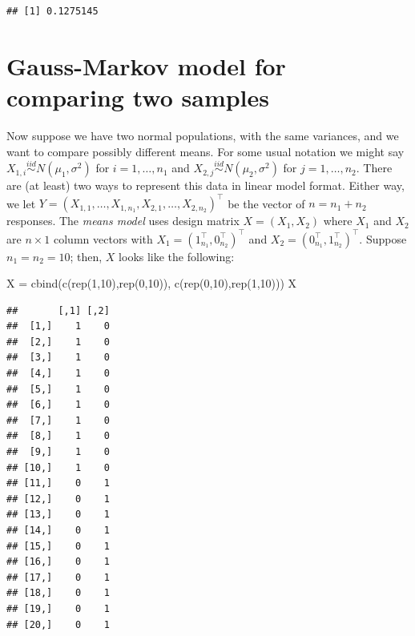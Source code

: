 \documentclass[
]{book}
\newenvironment{Shaded}{\begin{snugshade}}{\end{snugshade}}
\newcommand{\DecValTok}[1]{\textcolor[rgb]{0.00,0.00,0.81}{#1}}
\newcommand{\FunctionTok}[1]{\textcolor[rgb]{0.00,0.00,0.00}{#1}}
\newcommand{\NormalTok}[1]{#1}
\newcommand{\OtherTok}[1]{\textcolor[rgb]{0.56,0.35,0.01}{#1}}
\begin{document}
\begin{verbatim}
## [1] 0.1275145
\end{verbatim}

\hypertarget{gauss-markov-model-for-comparing-two-samples}{%
\section{Gauss-Markov model for comparing two samples}\label{gauss-markov-model-for-comparing-two-samples}}

Now suppose we have two normal populations, with the same variances, and we want to compare possibly different means. For some usual notation we might say \(X_{1,i}\stackrel{iid}{\sim}N(\mu_1, \sigma^2)\) for \(i=1, \ldots, n_1\) and \(X_{2,j}\stackrel{iid}{\sim}N(\mu_2, \sigma^2)\) for \(j=1, \ldots, n_2\). There are (at least) two ways to represent this data in linear model format. Either way, we let \(Y = (X_{1,1}, \ldots, X_{1,n_1}, X_{2,1}, \ldots, X_{2,n_2})^\top\) be the vector of \(n = n_1+n_2\) responses. The \emph{means model} uses design matrix \(X = (X_1, X_2)\) where \(X_1\) and \(X_2\) are \(n\times 1\) column vectors with \(X_1 = (1_{n_1}^\top, 0_{n_2}^\top)^{\top}\) and \(X_2 = (0_{n_1}^\top, 1_{n_2}^\top)^{\top}\). Suppose \(n_1 = n_2 = 10\); then, \(X\) looks like the following:

\begin{Shaded}
\begin{Highlighting}[]
\NormalTok{X }\OtherTok{=} \FunctionTok{cbind}\NormalTok{(}\FunctionTok{c}\NormalTok{(}\FunctionTok{rep}\NormalTok{(}\DecValTok{1}\NormalTok{,}\DecValTok{10}\NormalTok{),}\FunctionTok{rep}\NormalTok{(}\DecValTok{0}\NormalTok{,}\DecValTok{10}\NormalTok{)), }\FunctionTok{c}\NormalTok{(}\FunctionTok{rep}\NormalTok{(}\DecValTok{0}\NormalTok{,}\DecValTok{10}\NormalTok{),}\FunctionTok{rep}\NormalTok{(}\DecValTok{1}\NormalTok{,}\DecValTok{10}\NormalTok{)))}
\NormalTok{X}
\end{Highlighting}
\end{Shaded}

\begin{verbatim}
##       [,1] [,2]
##  [1,]    1    0
##  [2,]    1    0
##  [3,]    1    0
##  [4,]    1    0
##  [5,]    1    0
##  [6,]    1    0
##  [7,]    1    0
##  [8,]    1    0
##  [9,]    1    0
## [10,]    1    0
## [11,]    0    1
## [12,]    0    1
## [13,]    0    1
## [14,]    0    1
## [15,]    0    1
## [16,]    0    1
## [17,]    0    1
## [18,]    0    1
## [19,]    0    1
## [20,]    0    1
\end{verbatim}
\end{document}
